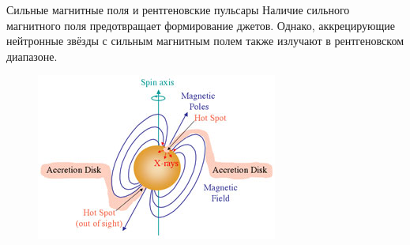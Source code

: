 \documentclass[8pt]{beamer}
\begin{document}
\begin{frame}{Сильные магнитные поля и рентгеновские пульсары}
    Наличие сильного магнитного поля предотвращает формирование джетов. Однако, аккрецирующие нейтронные звёзды с сильным магнитным полем также излучают в рентгеновском диапазоне.
    \begin{figure}
        \centering
        \includegraphics[height=.4\textwidth]{resources/x-raypulsar.jpg}
    \end{figure}
\end{frame}

%

\end{document}
